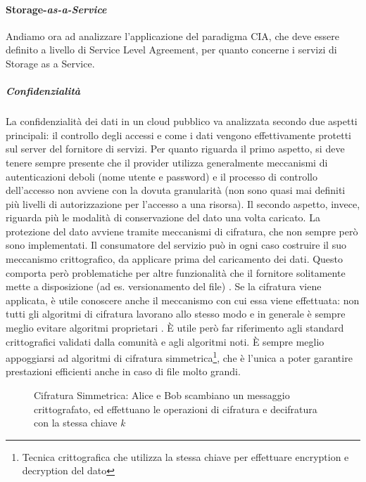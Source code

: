 \documentclass[../main.tex]{subfiles}
\begin{document}
\paragraph{Storage-\textit{as-a-Service}}
Andiamo ora ad analizzare l'applicazione del paradigma CIA, che deve essere definito a livello di Service Level Agreement, per quanto concerne i servizi di Storage as a Service.
\subparagraph{Confidenzialità}
La confidenzialità dei dati in un cloud pubblico va analizzata secondo due aspetti principali: il controllo degli accessi e come i dati vengono effettivamente protetti sul server del fornitore di servizi.
Per quanto riguarda il primo aspetto, si deve tenere sempre presente che il provider utilizza generalmente meccanismi di autenticazioni deboli (nome utente e password) e il processo di controllo dell'accesso non avviene con la dovuta granularità (non sono quasi mai definiti più livelli di autorizzazione per l'accesso a una risorsa).
Il secondo aspetto, invece, riguarda più le modalità di conservazione del dato una volta caricato. La protezione del dato avviene tramite meccanismi di cifratura, che non sempre però sono implementati.
Il consumatore del servizio può in ogni caso costruire il suo meccanismo crittografico, da applicare prima del caricamento dei dati. Questo comporta però problematiche per altre funzionalità che il fornitore solitamente mette a disposizione (ad es. versionamento del file) \cite{CloudSecurityBook}.
Se la cifratura viene applicata, è utile conoscere anche il meccanismo con cui essa viene effettuata: non tutti gli algoritmi di cifratura lavorano allo stesso modo e in generale è sempre meglio evitare algoritmi proprietari \cite{CloudSecurityBook}.
\`E utile però far riferimento agli standard crittografici validati dalla comunità e agli algoritmi noti.
\`E sempre meglio appoggiarsi ad algoritmi di cifratura simmetrica\footnote{Tecnica crittografica che utilizza la stessa chiave per effettuare encryption e decryption del dato}, che è l'unica a poter garantire prestazioni efficienti anche in caso di file molto grandi.
\begin{figure}[H]
\centering
{}
\caption[Cifratura Simmetrica]{Cifratura Simmetrica: Alice e Bob scambiano un messaggio crittografato, ed effettuano le operazioni di cifratura e decifratura con la stessa chiave \textit{k}}\label{fig:cifraturasimmetrica}
\end{figure}
\end{document}
